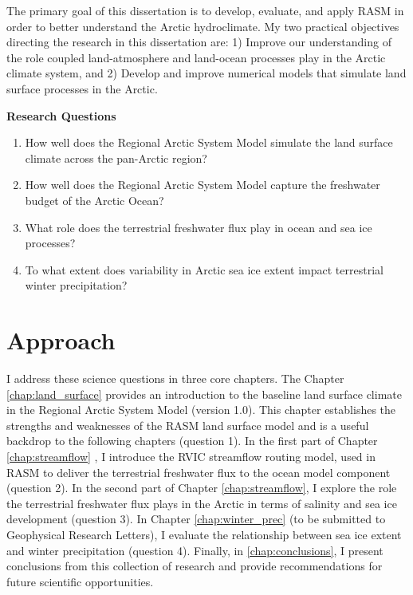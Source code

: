 The primary goal of this dissertation is to develop, evaluate, and apply RASM in order to better understand the Arctic hydroclimate.
My two practical objectives directing the research in this dissertation are: 1) Improve our understanding of the role coupled land-atmosphere and land-ocean processes play in the Arctic climate system, and 2) Develop and improve numerical models that simulate land surface processes in the Arctic.

\begin{mdframed}
  {\bf Research Questions}
  \begin{enumerate}
    \item How well does the Regional Arctic System Model simulate the land surface climate across the pan-Arctic region?
    \item How well does the Regional Arctic System Model capture the freshwater budget of the Arctic Ocean?
    \item What role does the terrestrial freshwater flux play in ocean and sea ice processes?
    \item To what extent does variability in Arctic sea ice extent impact terrestrial winter precipitation?
  \end{enumerate}
\end{mdframed}

\section{Approach}

I address these science questions in three core chapters.
The Chapter \ref{chap:land_surface} \citep[published as ][]{Hamman_2016a} provides an introduction to the baseline land surface climate in the Regional Arctic System Model (version 1.0).
This chapter establishes the strengths and weaknesses of the RASM land surface model and is a useful backdrop to the following chapters (question 1).
In the first part of Chapter \ref{chap:streamflow} \citep{Hamman_2016b}, I introduce the RVIC streamflow routing model, used in RASM to deliver the terrestrial freshwater flux to the ocean model component (question 2).
In the second part of Chapter \ref{chap:streamflow}, I explore the role the terrestrial freshwater flux plays in the Arctic in terms of salinity and sea ice development (question 3).
In Chapter \ref{chap:winter_prec} (to be submitted to Geophysical Research Letters), I evaluate the relationship between sea ice extent and winter precipitation (question 4).
Finally, in \ref{chap:conclusions}, I present conclusions from this collection of research and provide recommendations for future scientific opportunities.
